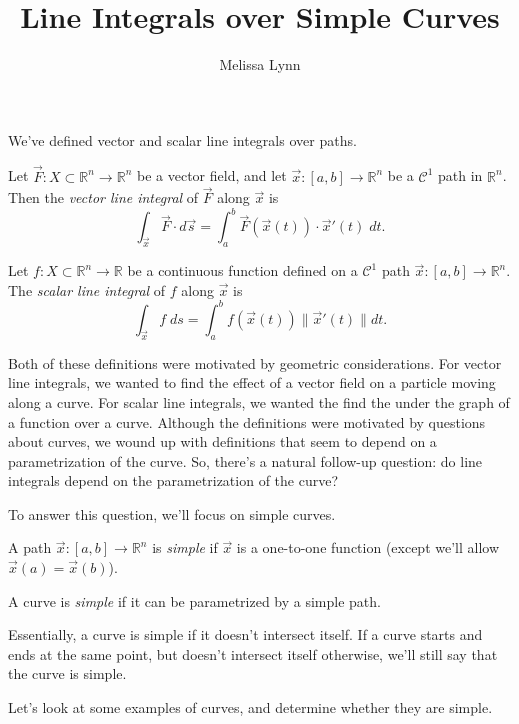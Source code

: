 \documentclass{ximera}
\title{Line Integrals over Simple Curves}
\author{Melissa Lynn}
\begin{document}
\begin{abstract}
\end{abstract}
\maketitle

We've defined vector and scalar line integrals over paths.

\begin{definition}
Let $\vec{F}:X\subset\mathbb{R}^n\rightarrow\mathbb{R}^n$ be a vector field, and let $\vec{x}:[a,b]\rightarrow\mathbb{R}^n$ be a $\mathcal{C}^1$ path in $\mathbb{R}^n$. Then the \emph{vector line integral} of $\vec{F}$ along $\vec{x}$ is
\[
\int_{\vec{x}}\vec{F}\cdot d\vec{s} = \int_a^b\vec{F}(\vec{x}(t))\cdot\vec{x}'(t)\;dt.
\]

Let $f:X\subset \mathbb{R}^n\rightarrow\mathbb{R}$ be a continuous function defined on a $\mathcal{C}^1$ path $\vec{x}:[a,b]\rightarrow\mathbb{R}^n$. The \emph{scalar line integral} of $f$ along $\vec{x}$ is
\[
\int_{\vec{x}} f\;ds = \int_a^b f(\vec{x}(t))\|\vec{x}'(t)\|dt.
\]
\end{definition}

Both of these definitions were motivated by geometric considerations. For vector line integrals, we wanted to find the effect of a vector field on a particle moving along a curve. For scalar line integrals, we wanted the find the under the graph of a function over a curve. Although the definitions were motivated by questions about curves, we wound up with definitions that seem to depend on a parametrization of the curve. So, there's a natural follow-up question: do line integrals depend on the parametrization of the curve?

To answer this question, we'll focus on simple curves.

\begin{definition}
A path $\vec{x}:[a,b]\rightarrow \mathbb{R}^n$ is \emph{simple} if $\vec{x}$ is a one-to-one function (except we'll allow $\vec{x}(a)=\vec{x}(b)$).

A curve is \emph{simple} if it can be parametrized by a simple path.
\end{definition}

Essentially, a curve is simple if it doesn't intersect itself. If a curve starts and ends at the same point, but doesn't intersect itself otherwise, we'll still say that the curve is simple.

Let's look at some examples of curves, and determine whether they are simple.
\end{document}
